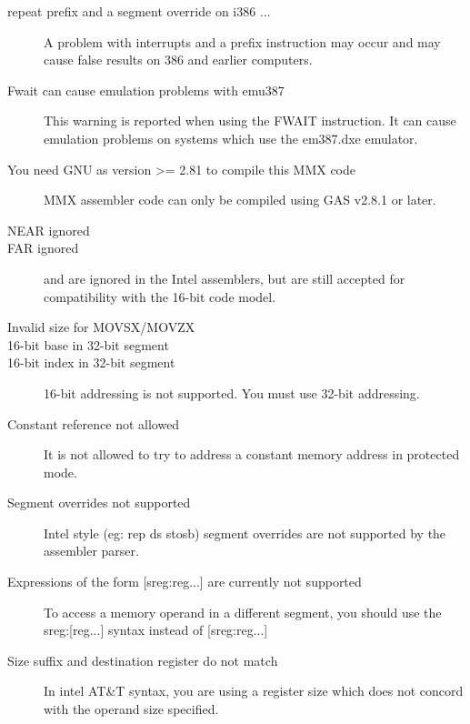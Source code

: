 \begin{description}
\item [repeat prefix and a segment override on \var{<=} i386 ...]
A problem with interrupts and a prefix instruction may occur and may cause
false results on 386 and earlier computers.

\item [Fwait can cause emulation problems with emu387]
This warning is reported when using the FWAIT instruction. It can
cause emulation problems on systems which use the em387.dxe emulator.

\item [You need GNU as version >= 2.81 to compile this MMX code]
MMX assembler code can only be compiled using GAS v2.8.1 or later.

\item [NEAR ignored]
\item [FAR ignored]
\label{FarIgnored}
 and  are ignored in the Intel assemblers, but 
are still accepted for compatibility with the 16-bit code model.

\item [Invalid size for MOVSX/MOVZX]

\item [16-bit base in 32-bit segment]
\item [16-bit index in 32-bit segment]
16-bit addressing is not supported. You must use 32-bit addressing.


\item [Constant reference not allowed]
It is not allowed to try to address a constant memory address in protected
mode.

\item [Segment overrides not supported]
Intel style (eg: rep ds stosb) segment overrides are not supported by
the assembler parser.

\item [{Expressions of the form [sreg:reg...] are currently not supported}]
To access a memory operand in a different segment, you should use the
sreg:[reg...] syntax instead of [sreg:reg...]

\item [Size suffix and destination register do not match]
In intel AT\&T syntax, you are using a register size which does
not concord with the operand size specified.


\end{description}
